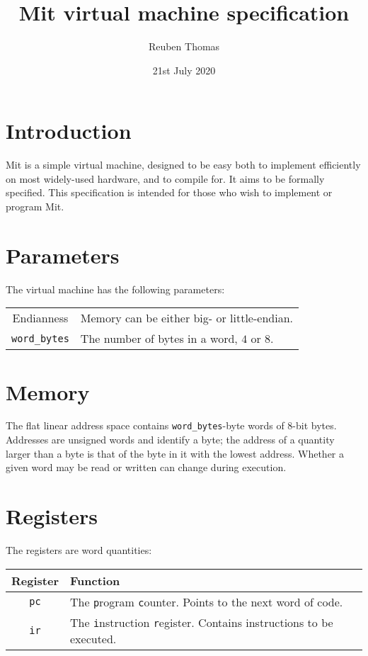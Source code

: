 \documentclass[a4paper]{article}
\title{Mit virtual machine specification}
\author{Reuben Thomas}
\date{21st July 2020}
\begin{document}
\maketitle

\section{Introduction}

Mit is a simple virtual machine, designed to be easy both to implement efficiently on most widely-used hardware, and to compile for. It aims to be formally specified. This specification is intended for those who wish to implement or program Mit.


\section{Parameters}

The virtual machine has the following parameters:

\begin{center}
\begin{tabular}{cp{3.25in}} \toprule
Endianness & Memory can be either big- or little-endian. \\
{\tt word\_bytes} & The number of bytes in a word, $4$ or $8$. \\
 \bottomrule
\end{tabular}
\end{center}


\section{Memory}

The flat linear address space contains {\tt word\_bytes}-byte words of $8$-bit bytes. Addresses are unsigned words and identify a byte; the address of a quantity larger than a byte is that of the byte in it with the lowest address. Whether a given word may be read or written can change during execution.


\section{Registers}
\label{registers}

The registers are word quantities:

\begin{center}
\begin{tabular}{cp{3.75in}} \toprule
\bf Register & \bf Function \\
 \midrule
{\tt pc} & The {\tt p}rogram {\tt c}ounter. Points to the next word of code. \\
{\tt ir} & The {\tt i}nstruction {\tt r}egister. Contains instructions to be executed. \\
 \bottomrule
\end{tabular}
\end{center}
\end{document}
